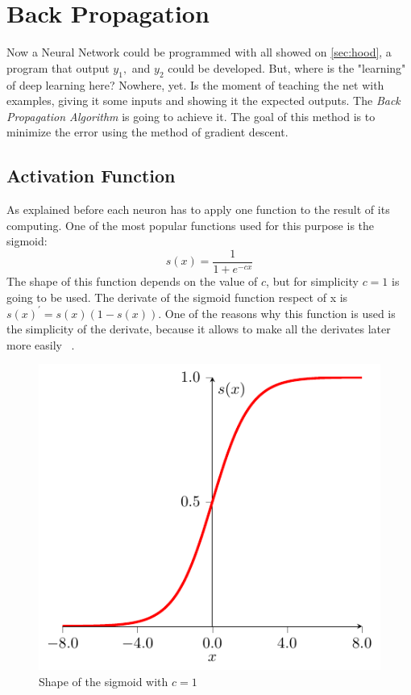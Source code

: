 \section{Back Propagation}
Now a Neural Network could be programmed with all showed on \ref{sec:hood}, a program that output $y_1,$ and $y_2$ could be developed. But, where is the "learning" of deep learning here? Nowhere, yet. Is the moment of teaching the net with examples, giving it some inputs and showing it the expected outputs. The \textit{Back Propagation Algorithm} is going to achieve it. The goal of this method is to minimize the error using the method of gradient descent.

\subsection{Activation Function}
As explained before each neuron has to apply one function to the result of its computing. One of the most popular functions used for this purpose is the sigmoid:
\begin{equation}
  s(x)=\frac{1}{1+e^{-cx}}
\end{equation}
The shape of this function depends on the value of $c$, but for simplicity $c=1$ is going to be used. The derivate of the sigmoid function respect of x is $s(x)^\prime=s(x)(1-s(x))$. One of the reasons why this function is used is the simplicity of the derivate, because it allows to make all the derivates later more easily ~\cite[Chapter~7]{rojas}.
\begin{figure}
  \center
  \includegraphics{images/sigmoid.pdf}
  \caption{Shape of the sigmoid with $c=1$}
\end{figure}

